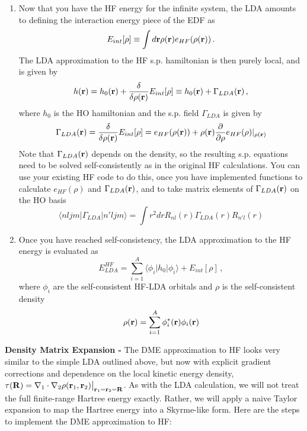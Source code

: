 \begin{enumerate}
\item Now that you have the HF energy for the infinite system, the LDA amounts to defining the interaction energy piece of the EDF as 
\begin{equation}
E_{int}[\rho] \equiv \int d{\bf r} \rho({\bf r}) e_{HF}(\rho({\bf r}))\,. 
\end{equation}
The LDA approximation to the HF s.p. hamiltonian is then purely local, and is given by
\begin{equation}
h({\bf r}) = h_0({\bf r}) + \frac{\delta}{\delta\rho({\bf r})} E_{int}[\rho]\equiv h_0({\bf r}) + \Gamma_{LDA}({\bf r})\,,
\end{equation}
where $h_0$ is the HO hamiltonian and the s.p. field $\Gamma_{LDA}$ is given by
\begin{equation}
\Gamma_{LDA}({\bf r}) = \frac{\delta}{\delta\rho({\bf r})} E_{int}[\rho] = e_{HF}(\rho({\bf r})) + \rho({\bf r})\frac{\partial}{\partial \rho}e_{HF}(\rho)|_{\rho({\bf r})}
\end{equation}
  Note that $\Gamma_{LDA}({\bf r})$ depends on the density, so the resulting s.p. equations need to be solved self-consistently as in the original HF calculations.  You can use your existing HF code to do this, once you have implemented functions to calculate $e_{HF}(\rho)$ and $\Gamma_{LDA}({\bf r})$, and to take matrix elements of  $\Gamma_{LDA}({\bf r})$ on the HO basis
\begin{equation}
\langle nljm|\Gamma_{LDA}|n'ljm\rangle = \int r^2dr R_{nl}(r) \Gamma_{LDA}(r)R_{n'l}(r)
\end{equation}
\item Once you have reached self-consistency, the LDA approximation to the HF energy is evaluated as 
\begin{equation}
E^{HF}_{LDA} = \sum_{i=1}^{A} \langle \phi_i|h_0|\phi_i\rangle + E_{int}[\rho]\,, 
\end{equation}
where $\phi_i$ are the self-consistent HF-LDA orbitals and $\rho$ is the self-consistent density
\begin{equation}
\rho({\bf r}) = \sum_{i=1}^{A} \phi^*_i({\bf r})\phi_i({\bf r})
\end{equation}
\end{enumerate}
{\bf Density Matrix Expansion -  }  The DME approximation to HF looks very similar to the simple LDA outlined above, but now with explicit gradient corrections and dependence on the local kinetic energy density, $\tau({\bf R}) = \nabla_1\cdot\nabla_2\rho({\bf r}_1,{\bf r}_2)\big|_{{\bf r}_1={\bf r}_2={\bf R}}$. As with the LDA calculation, we will not treat the full finite-range Hartree energy exactly. Rather, we will apply a naive Taylor expansion to map the Hartree energy into a Skyrme-like form. Here are the steps to implement the DME approximation to HF:

